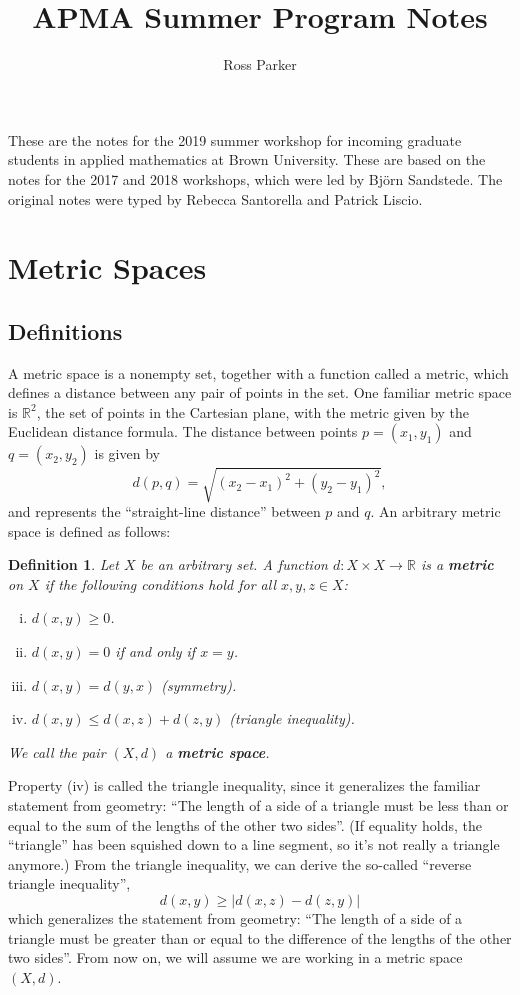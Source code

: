 \documentclass[12pt]{amsart}         %
\title{APMA Summer Program Notes}
\author{Ross Parker}
\newtheorem{definition}{Definition}[section]
\theoremstyle{remark}
\newcommand{\R}{\mathbb{R}}
\begin{document}
\maketitle

These are the notes for the 2019 summer workshop for incoming graduate students in applied mathematics at Brown University. These are based on the notes for the 2017 and 2018 workshops, which were led by Bj\"orn Sandstede. The original notes were typed by Rebecca Santorella and Patrick Liscio.

\tableofcontents

\section{Metric Spaces}
\label{sec: metric_spaces}

\subsection{Definitions}

A metric space is a nonempty set, together with a function called a metric, which defines a distance between any pair of points in the set. One familiar metric space is $\R^2$, the set of points in the Cartesian plane, with the metric given by the Euclidean distance formula. The distance between points $p = (x_1, y_1)$ and $q = (x_2, y_2)$ is given by 
\[
d(p, q) = \sqrt{ (x_2 - x_1)^2 + (y_2 - y_1)^2 },
\]
and represents the ``straight-line distance'' between $p$ and $q$. An arbitrary metric space is defined as follows:

\begin{definition}
Let $X$ be an arbitrary set. A function $d : X \times X \rightarrow \mathbb{R}$ is a \textbf{metric} on $X$ if the following conditions hold for all $x, y, z \in X$:
\begin{enumerate}[(i)]
\item $d(x,y) \geq 0$.
\item $d(x,y) = 0$ if and only if $x = y$.
\item $d(x,y) = d(y,x)$ (symmetry).
\item $d(x,y) \leq d(x,z) + d(z,y)$ (triangle inequality).
\end{enumerate}
We call the pair $(X, d)$ a \textbf{metric space}.
\end{definition}

Property (iv) is called the triangle inequality, since it generalizes the familiar statement from geometry: ``The length of a side of a triangle must be less than or equal to the sum of the lengths of the other two sides''. (If equality holds, the ``triangle'' has been squished down to a line segment, so it's not really a triangle anymore.) From the triangle inequality, we can derive the so-called ``reverse triangle inequality'',
\[
d(x,y) \geq  |d(x,z) - d(z, y)|
\]
which generalizes the statement from geometry: ``The length of a side of a triangle must be greater than or equal to the difference of the lengths of the other two sides''. From now on, we will assume we are working in a metric space $(X, d)$.
\end{document}
